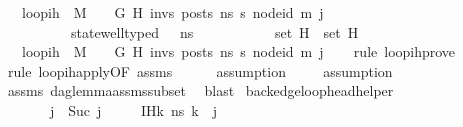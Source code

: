 \begin{isabellebody}
\ \ \ {\isachardoublequoteopen}loop{\isacharunderscore}{\kern0pt}ih\ \ M\ {\isasymLambda}\ {\isasymGamma}\ {\isasymOmega}\ G\ H\ invs\ posts\ ns{}\ s{\isacharprime}{\kern0pt}\ node{\isacharunderscore}{\kern0pt}id\ m{\isacharprime}{\kern0pt}\ j{\isachardoublequoteclose}\ \ \isanewline
\ \ \ \ \ \ \ \ \ \ {\isachardoublequoteopen}state{\isacharunderscore}{\kern0pt}well{\isacharunderscore}{\kern0pt}typed\ {\isasymLambda}\ {\isasymOmega}\ ns{}{\isachardoublequoteclose}\ \isanewline
\ \ \ \ \ \ \ \ \ \ {\isachardoublequoteopen}set\ H{\isacharprime}{\kern0pt}\ {\isasymsubseteq}\ set\ H{\isachardoublequoteclose}\isanewline
\ \ \ {\isachardoublequoteopen}loop{\isacharunderscore}{\kern0pt}ih\ \ M\ {\isasymLambda}\ {\isasymGamma}\ {\isasymOmega}\ G\ H{\isacharprime}{\kern0pt}\ invs\ posts\ ns{}\ s{\isacharprime}{\kern0pt}\ node{\isacharunderscore}{\kern0pt}id\ m{\isacharprime}{\kern0pt}\ j{\isachardoublequoteclose}\isanewline
%
\isadelimproof
\ \ %
\endisadelimproof
%
\isatagproof
{}\isamarkupfalse%
\ {\isacharparenleft}{\kern0pt}rule\ loop{\isacharunderscore}{\kern0pt}ih{\isacharunderscore}{\kern0pt}prove{\isacharparenright}{\kern0pt}\isanewline
\ \ \isamarkupfalse%
\ {\isacharparenleft}{\kern0pt}rule\ loop{\isacharunderscore}{\kern0pt}ih{\isacharunderscore}{\kern0pt}apply{\isacharbrackleft}{\kern0pt}OF\ assms{\isacharparenleft}{\kern0pt}{}{\isacharparenright}{\kern0pt}{\isacharbrackright}{\kern0pt}{\isacharparenright}{\kern0pt}\isanewline
\ \ \ \ \isamarkupfalse%
\ assumption\isanewline
\ \ \ \isamarkupfalse%
\ assumption\isanewline
\ \ \isamarkupfalse%
\ assms\ dag{\isacharunderscore}{\kern0pt}lemma{\isacharunderscore}{\kern0pt}assms{\isacharunderscore}{\kern0pt}subset\ \isamarkupfalse%
\ blast%
\endisatagproof
{\isafoldproof}%
%
\isadelimproof
\isanewline
%
\endisadelimproof
\isanewline
{}\isamarkupfalse%
\ backedge{\isacharunderscore}{\kern0pt}loop{\isacharunderscore}{\kern0pt}head{\isacharunderscore}{\kern0pt}helper{\isacharcolon}{\kern0pt}\isanewline
\ \ \ \isanewline
\ \ \ \ \ \ \ {\isachardoublequoteopen}j\ {\isacharequal}{\kern0pt}\ Suc\ j{\isacharprime}{\kern0pt}{\isachardoublequoteclose}\ \isanewline
\ \ \ \ IH{\isacharcolon}{\kern0pt}{\isachardoublequoteopen}{\isasymAnd}k\ ns{}{\isachardot}{\kern0pt}\ k\ {\isacharless}{\kern0pt}\ j\ {\isasymLongrightarrow}\isanewline

\end{isabellebody}

